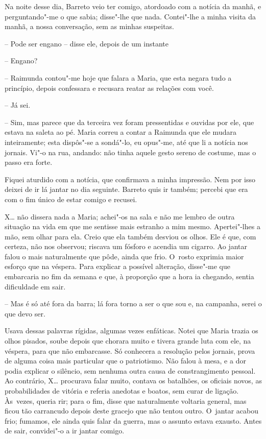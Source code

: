 Na noite desse dia, Barreto veio ter comigo, atordoado com a notícia da
manhã, e perguntando"-me o que sabia; disse"-lhe que nada. Contei"-lhe a
minha visita da manhã, a nossa conversação, sem as minhas suspeitas.

-- Pode ser engano -- disse ele, depois de um instante

-- Engano?

-- Raimunda contou"-me hoje que falara a Maria, que esta negara tudo a
princípio, depois confessara e recusara reatar as relações com você.

-- Já sei.

-- Sim, mas parece que da terceira vez foram pressentidas e ouvidas por
ele, que estava na saleta ao pé. Maria correu a contar a Raimunda que
ele mudara inteiramente; esta dispôs"-se a sondá"-lo, eu opus"-me, até que
li a notícia nos jornais. Vi"-o na rua, andando: não tinha aquele gesto
sereno de costume, mas o passo era forte.

Fiquei aturdido com a notícia, que confirmava a minha impressão. Nem por
isso deixei de ir lá jantar no dia seguinte. Barreto quis ir também;
percebi que era com o fim único de estar comigo e recusei.

X\ldots{} não dissera nada a Maria; achei"-os na sala e não me lembro de outra
situação na vida em que me sentisse mais estranho a mim mesmo.
Apertei"-lhes a mão, sem olhar para ela. Creio que ela também desviou os
olhos. Ele é que, com certeza, não nos observou; riscava um fósforo e
acendia um cigarro. Ao jantar falou o mais naturalmente que pôde, ainda
que frio. O~rosto exprimia maior esforço que na véspera. Para explicar a
possível alteração, disse"-me que embarcaria no fim da semana e que, à
proporção que a hora ia chegando, sentia dificuldade em sair.

-- Mas é só até fora da barra; lá fora torno a ser o que sou e, na
campanha, serei o que devo ser.

Usava dessas palavras rígidas, algumas vezes enfáticas. Notei que Maria
trazia os olhos pisados, soube depois que chorara muito e tivera grande
luta com ele, na véspera, para que não embarcasse. Só conhecera a
resolução pelos jornais, prova de alguma coisa mais particular que o
patriotismo. Não falou à mesa, e a dor podia explicar o silêncio, sem
nenhuma outra causa de constrangimento pessoal. Ao contrário, X\ldots{}
procurava falar muito, contava os batalhões, os oficiais novos, as
probabilidades de vitória e referia anedotas e boatos, sem curar de
ligação. Às~vezes, queria rir; para o fim, disse que naturalmente
voltaria general, mas ficou tão carrancudo depois deste gracejo que não
tentou outro. O~jantar acabou frio; fumamos, ele ainda quis falar da
guerra, mas o assunto estava exausto. Antes de sair, convidei"-o a ir
jantar comigo.


